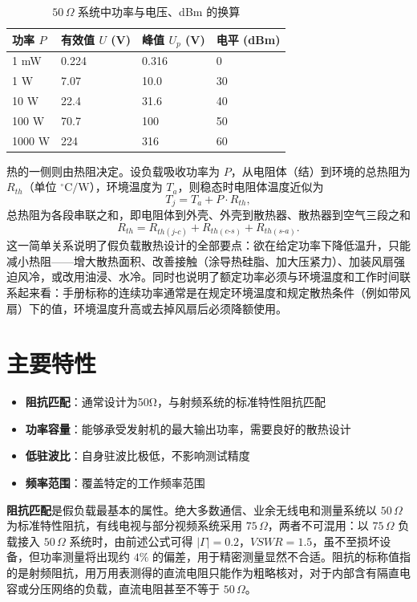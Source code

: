 \begin{table}[htbp]
\centering
\caption{$50\,\Omega$ 系统中功率与电压、dBm 的换算}
\begin{tabular}{|p{2.4cm}|p{2.8cm}|p{2.8cm}|p{2.6cm}|}
\hline
\textbf{功率 $P$} & \textbf{有效值 $U$ (V)} & \textbf{峰值 $U_p$ (V)} & \textbf{电平 (dBm)} \\
\hline
1 mW & 0.224 & 0.316 & 0 \\
\hline
1 W & 7.07 & 10.0 & 30 \\
\hline
10 W & 22.4 & 31.6 & 40 \\
\hline
100 W & 70.7 & 100 & 50 \\
\hline
1000 W & 224 & 316 & 60 \\
\hline
\end{tabular}
\end{table}

热的一侧则由热阻决定。设负载吸收功率为 $P$，从电阻体（结）到环境的总热阻为 $R_{th}$（单位 $^\circ\mathrm{C/W}$），环境温度为 $T_a$，则稳态时电阻体温度近似为
\[
T_j = T_a + P \cdot R_{th},
\]
总热阻为各段串联之和，即电阻体到外壳、外壳到散热器、散热器到空气三段之和
\[
R_{th} = R_{th(j\text{-}c)} + R_{th(c\text{-}s)} + R_{th(s\text{-}a)} .
\]
这一简单关系说明了假负载散热设计的全部要点：欲在给定功率下降低温升，只能减小热阻——增大散热面积、改善接触（涂导热硅脂、加大压紧力）、加装风扇强迫风冷，或改用油浸、水冷。同时也说明了额定功率必须与环境温度和工作时间联系起来看：手册标称的连续功率通常是在规定环境温度和规定散热条件（例如带风扇）下的值，环境温度升高或去掉风扇后必须降额使用。

\section{主要特性}
\label{sec:dummy_load_features}
\begin{itemize}
    \item \textbf{阻抗匹配}：通常设计为50Ω，与射频系统的标准特性阻抗匹配
    \item \textbf{功率容量}：能够承受发射机的最大输出功率，需要良好的散热设计
    \item \textbf{低驻波比}：自身驻波比极低，不影响测试精度
    \item \textbf{频率范围}：覆盖特定的工作频率范围
\end{itemize}

\textbf{阻抗匹配}是假负载最基本的属性。绝大多数通信、业余无线电和测量系统以 $50\,\Omega$ 为标准特性阻抗，有线电视与部分视频系统采用 $75\,\Omega$，两者不可混用：以 $75\,\Omega$ 负载接入 $50\,\Omega$ 系统时，由前述公式可得 $|\Gamma| = 0.2$，$VSWR = 1.5$，虽不至损坏设备，但功率测量将出现约 $4\%$ 的偏差，用于精密测量显然不合适。阻抗的标称值指的是射频阻抗，用万用表测得的直流电阻只能作为粗略核对，对于内部含有隔直电容或分压网络的负载，直流电阻甚至不等于 $50\,\Omega$。

